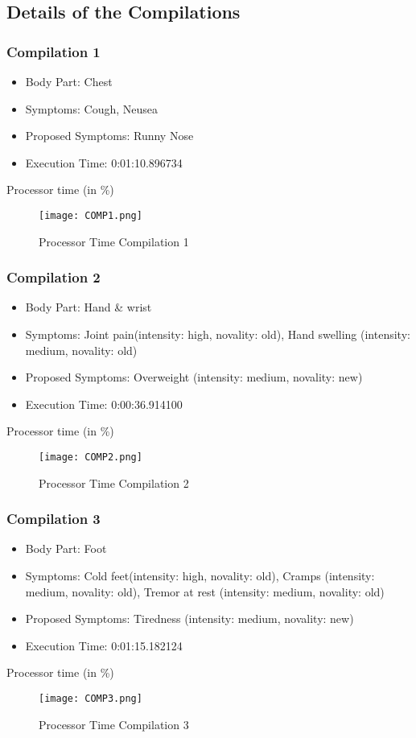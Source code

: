 \subsection{Details of the Compilations}
\subsubsection{Compilation 1}
\begin{itemize}
	\item Body Part: Chest
	\item Symptoms: Cough, Neusea
	\item Proposed Symptoms: Runny Nose
	\item Execution Time: 0:01:10.896734
\end{itemize}
Processor time (in \%)
\begin{figure}[H]
	\centering
	\texttt{[image: COMP1.png]}
	\caption{Processor Time Compilation 1}
\end{figure}

\pagebreak
\subsubsection{Compilation 2}
\begin{itemize}
	\item Body Part: Hand \& wrist 
	\item Symptoms: Joint pain(intensity: high, novality: old), Hand swelling (intensity: medium, novality: old)
	\item Proposed Symptoms: Overweight (intensity: medium, novality: new)
	\item Execution Time: 0:00:36.914100
\end{itemize}
Processor time (in \%)
\begin{figure}[H]
	\centering
	\texttt{[image: COMP2.png]}
	\caption{Processor Time Compilation 2}
\end{figure}

\pagebreak
\subsubsection{Compilation 3}
\begin{itemize}
	\item Body Part: Foot
	\item Symptoms: Cold feet(intensity: high, novality: old), Cramps  (intensity: medium, novality: old), Tremor at rest  (intensity: medium, novality: old)
	\item Proposed Symptoms: Tiredness (intensity: medium, novality: new)
	\item Execution Time: 0:01:15.182124
\end{itemize}
Processor time (in \%)
\begin{figure}[H]
	\centering
	\texttt{[image: COMP3.png]}
	\caption{Processor Time Compilation 3}
\end{figure}



\clearpage
\normalsize
{}

\begingroup
\pagestyle{plain}
\listoffigures
\listoftables
\endgroup







